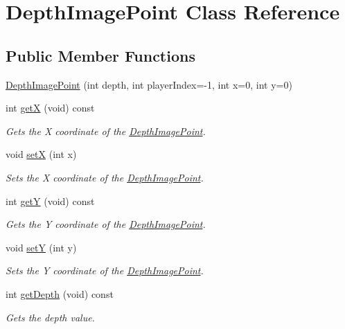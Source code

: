 \hypertarget{class_depth_image_point}{\section{\-Depth\-Image\-Point \-Class \-Reference}
\label{class_depth_image_point}
}
\subsection*{\-Public \-Member \-Functions}
\begin{DoxyCompactItemize}
\item 
\hyperlink{class_depth_image_point_a39950bd296ddaaf2d339af3c3ec80047}{\-Depth\-Image\-Point} (int depth, int player\-Index=-\/1, int x=0, int y=0)
\item 
int \hyperlink{class_depth_image_point_a74cd6795b7a3b9a81fc909527057e43a}{get\-X} (void) const 
\begin{DoxyCompactList}\small\item\em \-Gets the \-X coordinate of the \hyperlink{class_depth_image_point}{\-Depth\-Image\-Point}. \end{DoxyCompactList}\item 
void \hyperlink{class_depth_image_point_a3b511d1d2e194ada3bd0751885cbf856}{set\-X} (int x)
\begin{DoxyCompactList}\small\item\em \-Sets the \-X coordinate of the \hyperlink{class_depth_image_point}{\-Depth\-Image\-Point}. \end{DoxyCompactList}\item 
int \hyperlink{class_depth_image_point_a4d856c47e702863994f63541cd4ee892}{get\-Y} (void) const 
\begin{DoxyCompactList}\small\item\em \-Gets the \-Y coordinate of the \hyperlink{class_depth_image_point}{\-Depth\-Image\-Point}. \end{DoxyCompactList}\item 
void \hyperlink{class_depth_image_point_ac4eefdb22062c9bedbdfba660f0b2719}{set\-Y} (int y)
\begin{DoxyCompactList}\small\item\em \-Sets the \-Y coordinate of the \hyperlink{class_depth_image_point}{\-Depth\-Image\-Point}. \end{DoxyCompactList}\item 
int \hyperlink{class_depth_image_point_a43790a128d095f39790642f98dd14ed5}{get\-Depth} (void) const 
\begin{DoxyCompactList}\small\item\em \-Gets the depth value. \end{DoxyCompactList}\item 

\end{DoxyCompactItemize}
